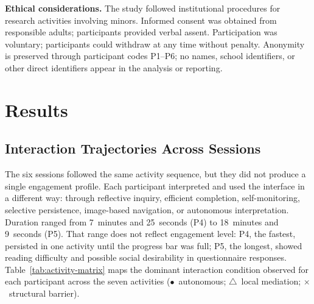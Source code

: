 \documentclass{llncs}
\begin{document}
\textbf{Ethical considerations.} The study followed institutional procedures for research
activities involving minors. Informed consent was obtained from
responsible adults; participants provided verbal assent. Participation was voluntary; participants could withdraw at any time without penalty. Anonymity is preserved through participant
codes P1--P6; no names, school identifiers, or other direct identifiers appear in the
analysis or reporting.

\section{Results}

\subsection{Interaction Trajectories Across Sessions}

The six sessions followed the same activity sequence, but they did not produce a single
engagement profile. Each participant interpreted and used the interface in a different way:
through reflective inquiry, efficient completion, self-monitoring, selective persistence,
image-based navigation, or autonomous interpretation. Duration ranged from 7~minutes and 25~seconds (P4) to 18~minutes and 9~seconds (P5). That range does not reflect engagement level: P4, the fastest, persisted in one activity until the progress bar was full; P5, the longest, showed reading difficulty and possible social desirability in questionnaire responses. Table~\ref{tab:activity-matrix} maps the dominant
interaction condition observed for each participant across the seven activities
(\(\bullet\)~autonomous; \(\triangle\)~local mediation; \(\times\)~structural barrier).
\end{document}
